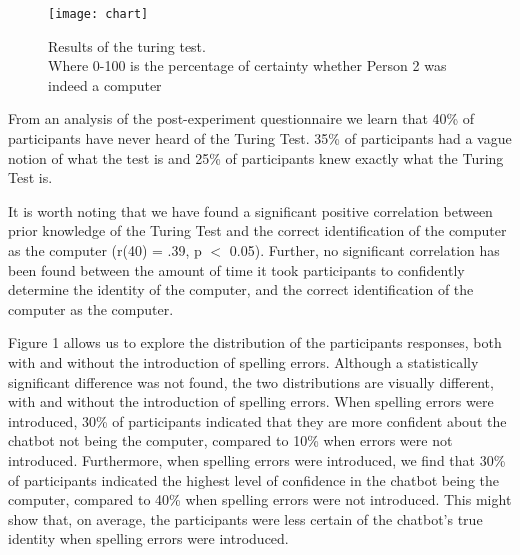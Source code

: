 \begin{figure}[ht]
   \begin{center}
      \texttt{[image: chart]}
   \end{center}
   \caption{Results of the turing test.\\ Where 0-100 is the percentage of certainty whether Person 2 was indeed a computer}
\end{figure}

From an analysis of the post-experiment questionnaire we learn that 40\% of participants have never heard of the Turing Test. 35\% of participants had a vague notion of what the test is and 25\% of participants knew exactly what the Turing Test is.

It is worth noting that we have found a significant positive correlation between prior knowledge of the Turing Test and the correct identification of the computer as the computer (r(40) = .39, p $<$ 0.05). Further, no significant correlation has been found between the amount of time it took participants to confidently determine the identity of the computer, and the correct identification of the computer as the computer.

Figure 1 allows us to explore the distribution of the participants responses, both with and without the introduction of spelling errors. Although a statistically significant difference was not found, the two distributions are visually different, with and without the introduction of spelling errors. When spelling errors were introduced, 30\% of participants indicated that they are more confident about the chatbot not being the computer, compared to 10\% when errors were not introduced. Furthermore, when spelling errors were introduced, we find that 30\% of participants indicated the highest level of confidence in the chatbot being the computer, compared to 40\% when spelling errors were not introduced. This might show that, on average, the participants were less certain of the chatbot's true identity when spelling errors were introduced.
